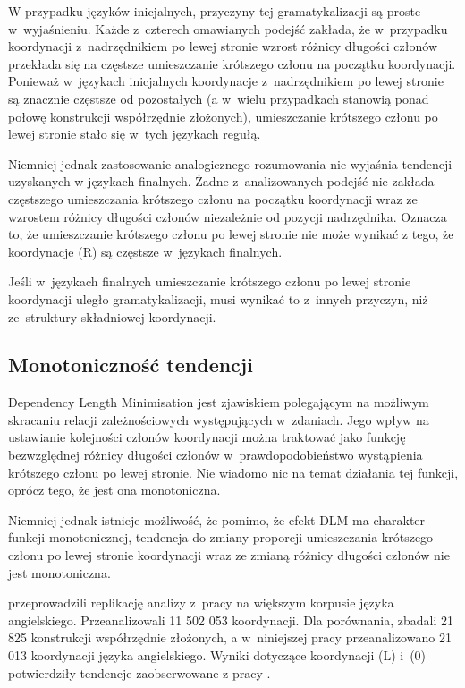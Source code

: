 W przypadku języków inicjalnych, przyczyny tej gramatykalizacji są proste w~wyjaśnieniu. Każde z~czterech omawianych podejść zakłada, że w~przypadku  koordynacji z~nadrzędnikiem po lewej stronie wzrost różnicy długości członów przekłada się na częstsze umieszczanie krótszego członu na początku koordynacji. Ponieważ w~językach inicjalnych koordynacje z~nadrzędnikiem po lewej stronie są znacznie częstsze od pozostałych (a w~wielu przypadkach stanowią ponad połowę konstrukcji współrzędnie złożonych), umieszczanie krótszego członu po lewej stronie stało się w~tych językach regułą. 

Niemniej jednak zastosowanie analogicznego rozumowania nie wyjaśnia tendencji uzyskanych w językach finalnych. Żadne z~analizowanych podejść nie zakłada częstszego umieszczania krótszego członu na początku koordynacji wraz ze wzrostem różnicy długości członów niezależnie od pozycji nadrzędnika. Oznacza to, że umieszczanie krótszego członu po lewej stronie nie może wynikać z tego, że koordynacje (R) są częstsze w~językach finalnych.

Jeśli w~językach finalnych umieszczanie krótszego członu po lewej stronie koordynacji uległo gramatykalizacji, musi wynikać to z~innych przyczyn, niż ze~struktury składniowej koordynacji. 

\subsection{Monotoniczność tendencji}

Dependency Length Minimisation jest zjawiskiem polegającym na możliwym skracaniu relacji zależnościowych występujących w~zdaniach. Jego wpływ na ustawianie kolejności członów koordynacji można traktować jako funkcję bezwzględnej różnicy długości członów w~prawdopodobieństwo wystąpienia krótszego członu po lewej stronie. Nie wiadomo nic na temat działania tej funkcji, oprócz tego, że jest ona monotoniczna.

Niemniej jednak istnieje możliwość, że pomimo, że efekt DLM ma charakter funkcji monotonicznej, tendencja do zmiany proporcji umieszczania krótszego członu po lewej stronie koordynacji wraz ze zmianą różnicy długości członów nie jest monotoniczna. 

\cite{przepiorkowski2024argument} przeprowadzili replikację analizy z~pracy \cite{przepiorkowski2023conjunct} na większym korpusie języka angielskiego. Przeanalizowali 11 502 053 koordynacji. Dla porównania, \cite{przepiorkowski2023conjunct} zbadali 21 825 konstrukcji współrzędnie złożonych, a w~niniejszej pracy przeanalizowano 21 013 koordynacji języka angielskiego. Wyniki dotyczące koordynacji (L) i~(0) potwierdziły tendencje zaobserwowane z pracy \cite{przepiorkowski2023conjunct}. 

